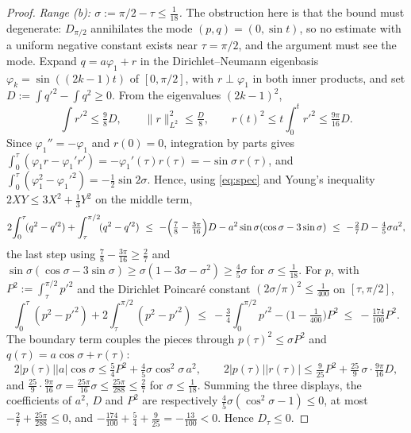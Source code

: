 \documentclass[11pt]{article}
\theoremstyle{definition}
\begin{document}
\begin{proof}
\emph{Range (b): $\sigma:=\pi/2-\tau\le\tfrac1{18}$.} The obstruction here is that the
bound must degenerate: $D_{\pi/2}$ annihilates the mode $(p,q)=(0,\sin t)$, so no estimate
with a uniform negative constant exists near $\tau=\pi/2$, and the argument must see the
mode. Expand $q=a\varphi_1+r$ in the Dirichlet--Neumann eigenbasis
$\varphi_k=\sin((2k-1)t)$ of $[0,\pi/2]$, with $r\perp\varphi_1$ in both inner products,
and set $D:=\int q'^2-\int q^2\ge0$. From the eigenvalues $(2k-1)^2$,
\begin{equation}\label{eq:spec}
  \int r'^2\le\tfrac98D,\qquad \|r\|_{L^2}^2\le\tfrac{D}8,\qquad
  r(t)^2\le t\!\int_0^t\!r'^2\le\tfrac{9\pi}{16}D .
\end{equation}
Since $\varphi_1''=-\varphi_1$ and $r(0)=0$, integration by parts gives
$\int_0^\tau(\varphi_1r-\varphi_1'r')=-\varphi_1'(\tau)r(\tau)=-\sin\sigma\,r(\tau)$, and
$\int_0^\tau(\varphi_1^2-\varphi_1'^2)=-\tfrac12\sin2\sigma$. Hence, using
\eqref{eq:spec} and Young's inequality $2XY\le3X^2+\tfrac13Y^2$ on the middle term,
\[
  2\!\int_0^\tau\!(q^2-q'^2)+\int_\tau^{\pi/2}\!(q^2-q'^2)
  \ \le\ -\Bigl(\tfrac78-\tfrac{3\pi}{16}\Bigr)D-a^2\sin\sigma(\cos\sigma-3\sin\sigma)
  \ \le\ -\tfrac27D-\tfrac45\sigma a^2 ,
\]
the last step using $\tfrac78-\tfrac{3\pi}{16}\ge\tfrac27$ and
$\sin\sigma(\cos\sigma-3\sin\sigma)\ge\sigma(1-3\sigma-\sigma^2)\ge\tfrac45\sigma$ for
$\sigma\le\tfrac1{18}$. For $p$, with $P^2:=\int_\tau^{\pi/2}p'^2$ and the Dirichlet
Poincar\'e constant $(2\sigma/\pi)^2\le\tfrac1{400}$ on $[\tau,\pi/2]$,
\[
  \int_0^\tau(p^2-p'^2)+2\!\int_\tau^{\pi/2}\!(p^2-p'^2)
  \ \le\ -\tfrac34\int_0^{\pi/2}p'^2-\bigl(1-\tfrac1{400}\bigr)P^2\ \le\ -\tfrac{174}{100}P^2 .
\]
The boundary term couples the pieces through $p(\tau)^2\le\sigma P^2$ and
$q(\tau)=a\cos\sigma+r(\tau)$:
\[
  2|p(\tau)||a|\cos\sigma\le\tfrac54P^2+\tfrac45\sigma\cos^2\!\sigma\,a^2,\qquad
  2|p(\tau)||r(\tau)|\le\tfrac9{25}P^2+\tfrac{25}9\,\sigma\cdot\tfrac{9\pi}{16}D ,
\]
and $\tfrac{25}9\cdot\tfrac{9\pi}{16}\,\sigma=\tfrac{25\pi}{16}\sigma\le\tfrac{25\pi}{288}
\le\tfrac27$ for $\sigma\le\tfrac1{18}$. Summing the three displays, the coefficients of
$a^2$, $D$ and $P^2$ are respectively $\tfrac45\sigma(\cos^2\sigma-1)\le0$, at most
$-\tfrac27+\tfrac{25\pi}{288}\le0$, and $-\tfrac{174}{100}+\tfrac54+\tfrac9{25}
=-\tfrac{13}{100}<0$. Hence $D_\tau\le0$.


\end{proof}
\end{document}
